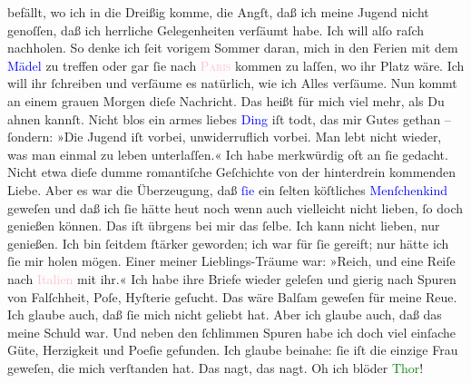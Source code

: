                befällt, wo ich in die Dreißig komme, die Angſt, daß ich \strikeout{\textcolor{gray}{d}} meine Jugend nicht genoſſen, daß ich herrliche
               Gelegenheiten verſäumt habe. Ich will alſo raſch nachholen. So denke ich ſeit vorigem
               Sommer daran, mich in den Ferien {\pb}mit dem \textcolor{blue}{Mädel}{} zu treffen oder gar ſie
               nach \textsc{\textcolor{pink}{Paris}{}\ledrightnote{\textcolor{pink}{Paris}}} kommen zu
               laſſen, wo ihr Platz wäre. Ich will ihr ſchreiben und verſäume es natürlich, wie ich
               Alles verſäume. Nun kommt an einem grauen Morgen dieſe Nachricht. Das heißt für mich
               viel mehr, als Du ahnen kannſt. Nicht blos ein armes liebes \textcolor{blue}{Ding}{} iſt todt, das mir Gutes gethan –
               ſondern: »Die Jugend iſt vorbei, unwiderruflich vorbei. Man lebt nicht wieder, was
               man einmal zu leben unterlaſſen.«\pend
           \pstart
           Ich habe merkwürdig oft an ſie gedacht. Nicht etwa dieſe dumme romantiſche Geſchichte
               von der hinterdrein kommenden Liebe. Aber  es war
               die Überzeugung, daß \textcolor{blue}{ſie}{} ein
               ſelten köſtliches \textcolor{blue}{Menſchenkind}{}
               geweſen {\pb}und daß ich ſie hätte heut noch wenn auch vielleicht nicht lieben, ſo doch
               genießen können. Das iſt übrgens bei mir das ſelbe. Ich kann nicht lieben, nur
               genießen. Ich bin ſeitdem ſtärker geworden; ich war für ſie gereift; nur hätte ich
               ſie mir holen mögen. Einer meiner Lieblings-Träume war: »Reich, und eine Reiſe nach
                  \textcolor{pink}{Italien}{}\ledrightnote{\textcolor{pink}{Italien}} mit ihr.«\pend
           \pstart
           Ich habe ihre Briefe wieder geleſen und gierig nach Spuren von Falſchheit, Poſe,
               Hyſterie geſucht. Das wäre Balſam geweſen für meine Reue. Ich glaube auch, daß ſie
               mich nicht geliebt hat. Aber ich glaube auch, daß das meine Schuld war. Und neben den
                  {\pb}ſchlimmen Spuren habe ich doch viel einſache
               Güte, Herzigkeit und Poeſie gefunden. Ich glaube beinahe: ſie iſt die einzige Frau
               geweſen, die mich \strikeout{\textcolor{gray}{ver}} verſtanden
               hat. Das nagt, das nagt. Oh ich blöder \textcolor{green}{Thor}{}!\pend
